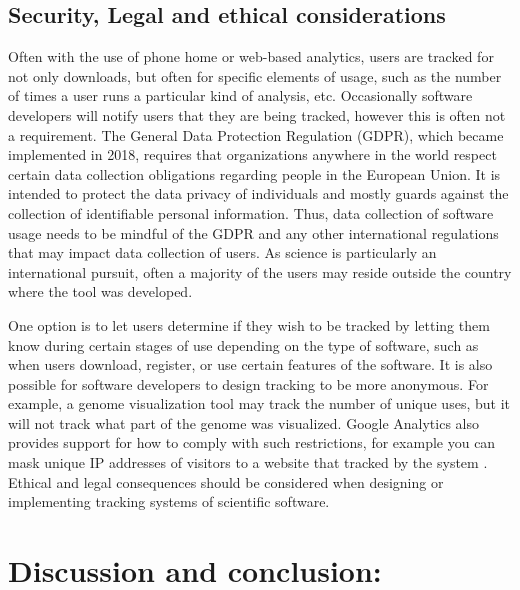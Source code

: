 \documentclass{article}
\begin{document}
\subsection{Security, Legal and ethical considerations}\label{sec:legal_ethics}
Often with the use of phone home or web-based analytics, users are tracked for not only downloads, but often for specific elements of usage, such as the number of times a user runs a particular kind of analysis, etc. Occasionally software developers will notify users that they are being tracked, however this is often not a requirement. The General Data Protection Regulation (GDPR), which became implemented in 2018, requires that organizations anywhere in the world respect certain data collection obligations regarding people in the European Union. It is intended to protect the data privacy of individuals and mostly guards against the collection of identifiable personal information. Thus, data collection of software usage needs to be mindful of the GDPR and any other international regulations that may impact data collection of users.  As science is particularly an international pursuit, often a majority of the users may reside outside the country where the tool was developed.

One option is to let users determine if they wish to be tracked by letting them know during certain stages of use depending on the type of software, such as when users download, register, or use certain features of the software. It is also possible for software developers to design tracking to be more anonymous. For example, a genome visualization tool may track the number of unique uses, but it will not track what part of the genome was visualized. Google Analytics also provides support for how to comply with such restrictions, for example you can  mask unique IP addresses of visitors to a website that tracked by the system \cite{google_analytics_privacy}.  Ethical and legal consequences should be considered when designing or implementing tracking systems of scientific software. 



\section{Discussion and conclusion:}
\end{document}
